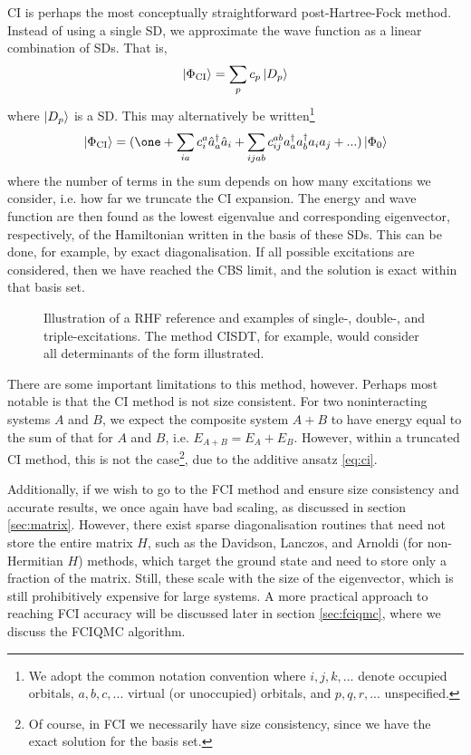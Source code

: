 \gls{CI} is perhaps the most conceptually straightforward post-Hartree-Fock method. Instead of using a single \gls{SD}, we approximate the wave function as a linear combination of \glspl{SD}. That is,
\begin{equation}
\ket{\Phi_\mathrm{CI}} = \sum_p c_p\ket{D_p}
\end{equation}
where $\ket{D_p}$ is a \gls{SD}. This may alternatively be written\footnote{We adopt the common notation convention where $i,j,k,...$ denote occupied orbitals, $a,b,c,...$ virtual (or unoccupied) orbitals, and $p,q,r, ...$ unspecified.}
\begin{equation}
\label{eq:ci}
\ket{\Phi_\mathrm{CI}} = (\one + \sum_{ia}c_i^a\hat a_a^\dag\hat a_i +
\sum_{ijab}c_{ij}^{ab} a_a^\dag a_b^\dag a_i a_j+...)\ket{\Phi_0}
\end{equation}
where the number of terms in the sum depends on how many excitations we consider, i.e. how far we truncate the \gls{CI} expansion. The energy and wave function are then found as the lowest eigenvalue and corresponding eigenvector, respectively, of the Hamiltonian written in the basis of these \glspl{SD}. This can be done, for example, by exact diagonalisation. If all possible excitations are considered, then we have reached the \gls{CBS} limit, and the solution is exact within that basis set.

\begin{figure}[htbp]
    \centering

    \caption{Illustration of a \gls{RHF} reference and examples of single-, double-, and triple-excitations. The method CISDT, for example, would consider all determinants of the form illustrated.}
    \label{fig:excitations}
\end{figure}

There are some important limitations to this method, however. Perhaps most notable is that the \gls{CI} method is not size consistent. For two noninteracting systems $A$ and $B$, we expect the composite system $A+B$ to have energy equal to the sum of that for $A$ and $B$, i.e. $E_{A+B}=E_A+E_B$. However, within a truncated \gls{CI} method, this is not the case\footnote{Of course, in \gls{FCI} we necessarily have size consistency, since we have the exact solution for the basis set.}, due to the additive ansatz \eqref{eq:ci}.

Additionally, if we wish to go to the \gls{FCI} method and ensure size consistency and accurate results, we once again have bad scaling, as discussed in section \ref{sec:matrix}. However, there exist sparse diagonalisation routines that need not store the entire matrix $H$, such as the Davidson, Lanczos, and Arnoldi (for non-Hermitian $H$)  methods, which target the ground state and need to store only a fraction of the matrix. Still, these scale with the size of the eigenvector, which is still prohibitively expensive for large systems. A more practical approach to reaching \gls{FCI} accuracy will be discussed later in section \ref{sec:fciqmc}, where we discuss the \gls{FCIQMC} algorithm.

